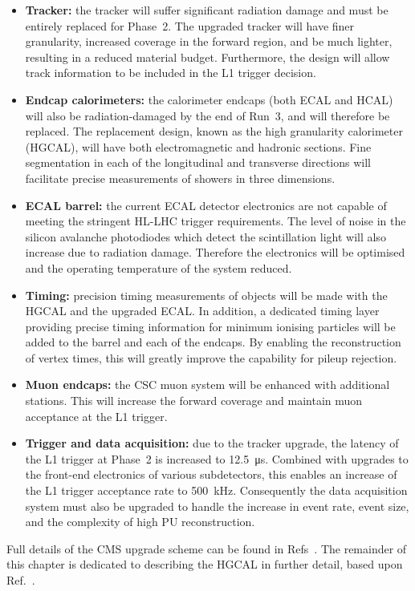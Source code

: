 \begin{itemize}
  \item{\textbf{Tracker:}
  the tracker will suffer significant radiation damage and must be entirely replaced for Phase~2.
  The upgraded tracker will have finer granularity, %
  increased coverage in the forward region, %
  and be much lighter, resulting in a reduced material budget.
  Furthermore, the design will allow track information to be included in the L1 trigger decision.}
  \item{\textbf{Endcap calorimeters:}
  the calorimeter endcaps (both ECAL and HCAL) will also be radiation-damaged by the end of Run~3, and will therefore be replaced.
  The replacement design, known as the high granularity calorimeter (HGCAL), will have both electromagnetic and hadronic sections.
  Fine segmentation in each of the longitudinal and transverse directions will facilitate precise measurements of showers in three dimensions.}
  \item{\textbf{ECAL barrel:}
  the current ECAL detector electronics are not capable of meeting the stringent HL-LHC trigger requirements.
  The level of noise in the silicon avalanche photodiodes which detect the scintillation light will also increase due to radiation damage.
  Therefore the electronics will be optimised and the operating temperature of the system reduced.} %
  \item{\textbf{Timing:}
  precision timing measurements of objects will be made with the HGCAL and the upgraded ECAL.
  In addition, a dedicated timing layer providing precise timing information for minimum ionising particles will be added to the barrel and each of the endcaps.
  By enabling the reconstruction of vertex times, this will greatly improve the capability for pileup rejection.}
  \item{\textbf{Muon endcaps:}
  the CSC muon system will be enhanced with additional stations.
  This will increase the forward coverage and maintain muon acceptance at the L1 trigger.}
  \item{\textbf{Trigger and data acquisition:}
  due to the tracker upgrade, the latency of the L1 trigger at Phase~2 is increased to \SI{12.5}{\micro\second}.
  Combined with upgrades to the front-end electronics of various subdetectors, %
  this enables an increase of the L1 trigger acceptance rate to \SI{500}{\kilo\hertz}.
  Consequently the data acquisition system must also be upgraded to handle the increase in event rate, event size, and the complexity of high PU reconstruction.}
\end{itemize}
Full details of the CMS upgrade scheme can be found in Refs~\cite{Tracker_Phase2TDR,Barrel_Phase2TDR,Muon_Phase2TDR,Trigger_Phase2TDR,DAQ_Phase2TDR,MTD,HGCAL}.
The remainder of this chapter is dedicated to describing the HGCAL in further detail, based upon Ref.~\cite{HGCAL}.

